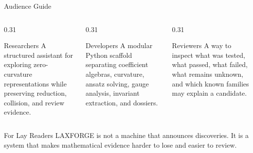 \documentclass[aspectratio=169,11pt]{beamer}
\begin{document}
\begin{frame}{Audience Guide}
  \begin{columns}[T,totalwidth=\textwidth]
    \begin{column}{0.31\textwidth}
      \begin{block}{Researchers}
        A structured assistant for exploring zero-curvature representations
        while preserving reduction, collision, and review evidence.
      \end{block}
    \end{column}
    \begin{column}{0.31\textwidth}
      \begin{block}{Developers}
        A modular Python scaffold separating coefficient algebras, curvature,
        ansatz solving, gauge analysis, invariant extraction, and dossiers.
      \end{block}
    \end{column}
    \begin{column}{0.31\textwidth}
      \begin{block}{Reviewers}
        A way to inspect what was tested, what passed, what failed, what
        remains unknown, and which known families may explain a candidate.
      \end{block}
    \end{column}
  \end{columns}
  \vspace{0.4cm}
  \begin{block}{For Lay Readers}
    LAXFORGE is not a machine that announces discoveries. It is a system that
    makes mathematical evidence harder to lose and easier to review.
  \end{block}
\end{frame}
\end{document}
